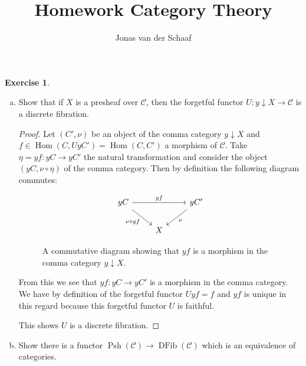 \documentclass{article}
\title{Homework Category Theory}
\author{Jonas van der Schaaf}
\date{}
\DeclareMathOperator{\Hom}{Hom}
\newcommand{\cat}{\mathcal{C}}
\DeclareMathOperator{\psh}{Psh}
\DeclareMathOperator{\dfib}{DFib}
\theoremstyle{definition}
\newtheorem{question}{Exercise}
\begin{document}
\maketitle

\begin{question}
    \begin{enumerate}[(a)]
        \item Show that if \(X\) is a presheaf over \(\cat\), then the forgetful
              functor \(U:y\downarrow X\to \cat\) is a discrete fibration.

              \begin{proof}
                  Let \((C',\nu)\) be an object of the comma category
                  \(y\downarrow X\) and \(f\in\Hom(C,UyC')=\Hom(C,C')\) a
                  morphism of \(\cat\). Take \(\eta=yf:yC\to yC'\) the natural
                  transformation and consider the object \((yC,\nu\circ\eta)\)
                  of the comma category. Then by definition the following
                  diagram commutes:
                  \begin{figure}[H]
                      \[
                          \begin{tikzcd}[ampersand replacement=\&]
                              {yC} \&\& yC' \\
                              \& X
                              \arrow["yf", from=1-1, to=1-3]
                              \arrow["{\nu\circ yf}"', from=1-1, to=2-2]
                              \arrow["\nu", from=1-3, to=2-2]
                          \end{tikzcd}
                      \]
                      \caption{A commutative diagram showing that \(yf\) is a morphism in the comma category \(y\downarrow X\).}
                      \label{fig:comm-dia-2}
                  \end{figure}
                  From this we see that \(yf:yC\to yC'\) is a morphism in the
                  comma category. We have by definition of the forgetful functor
                  \(Uyf=f\) and \(yf\) is unique in this regard because this
                  forgetful functor \(U\) is faithful.

                  This shows \(U\) is a discrete fibration.
              \end{proof}

        \item Show there is a functor \(\psh(\cat)\to\dfib(\cat)\) which is an
              equivalence of categories.


\end{enumerate}
\end{question}
\end{document}
